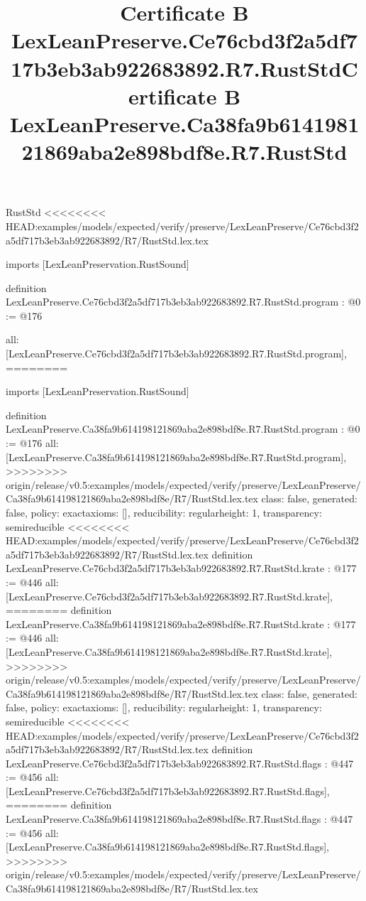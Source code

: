 \begin{lexlean}{RustStd}
<<<<<<<< HEAD:examples/models/expected/verify/preserve/LexLeanPreserve/Ce76cbd3f2a5df717b3eb3ab922683892/R7/RustStd.lex.tex
\title{Certificate B LexLeanPreserve.Ce76cbd3f2a5df717b3eb3ab922683892.R7.RustStd}
\begin{coremodule}
imports [LexLeanPreservation.RustSound]

definition LexLeanPreserve.Ce76cbd3f2a5df717b3eb3ab922683892.R7.RustStd.program : @0 := @176 {
  all: [LexLeanPreserve.Ce76cbd3f2a5df717b3eb3ab922683892.R7.RustStd.program],
========
\title{Certificate B LexLeanPreserve.Ca38fa9b614198121869aba2e898bdf8e.R7.RustStd}
\begin{coremodule}
imports [LexLeanPreservation.RustSound]

definition LexLeanPreserve.Ca38fa9b614198121869aba2e898bdf8e.R7.RustStd.program : @0 := @176 {
  all: [LexLeanPreserve.Ca38fa9b614198121869aba2e898bdf8e.R7.RustStd.program],
>>>>>>>> origin/release/v0.5:examples/models/expected/verify/preserve/LexLeanPreserve/Ca38fa9b614198121869aba2e898bdf8e/R7/RustStd.lex.tex
  class: false,
  generated: false,
  policy: exact{axioms: []},
  reducibility: regular{height: 1},
  transparency: semireducible
}
<<<<<<<< HEAD:examples/models/expected/verify/preserve/LexLeanPreserve/Ce76cbd3f2a5df717b3eb3ab922683892/R7/RustStd.lex.tex
definition LexLeanPreserve.Ce76cbd3f2a5df717b3eb3ab922683892.R7.RustStd.krate : @177 := @446 {
  all: [LexLeanPreserve.Ce76cbd3f2a5df717b3eb3ab922683892.R7.RustStd.krate],
========
definition LexLeanPreserve.Ca38fa9b614198121869aba2e898bdf8e.R7.RustStd.krate : @177 := @446 {
  all: [LexLeanPreserve.Ca38fa9b614198121869aba2e898bdf8e.R7.RustStd.krate],
>>>>>>>> origin/release/v0.5:examples/models/expected/verify/preserve/LexLeanPreserve/Ca38fa9b614198121869aba2e898bdf8e/R7/RustStd.lex.tex
  class: false,
  generated: false,
  policy: exact{axioms: []},
  reducibility: regular{height: 1},
  transparency: semireducible
}
<<<<<<<< HEAD:examples/models/expected/verify/preserve/LexLeanPreserve/Ce76cbd3f2a5df717b3eb3ab922683892/R7/RustStd.lex.tex
definition LexLeanPreserve.Ce76cbd3f2a5df717b3eb3ab922683892.R7.RustStd.flags : @447 := @456 {
  all: [LexLeanPreserve.Ce76cbd3f2a5df717b3eb3ab922683892.R7.RustStd.flags],
========
definition LexLeanPreserve.Ca38fa9b614198121869aba2e898bdf8e.R7.RustStd.flags : @447 := @456 {
  all: [LexLeanPreserve.Ca38fa9b614198121869aba2e898bdf8e.R7.RustStd.flags],
>>>>>>>> origin/release/v0.5:examples/models/expected/verify/preserve/LexLeanPreserve/Ca38fa9b614198121869aba2e898bdf8e/R7/RustStd.lex.tex
}}}
\end{coremodule}}
\end{coremodule}
\end{lexlean}
